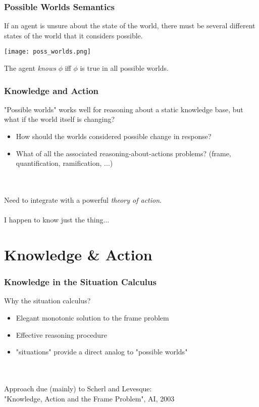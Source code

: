 \documentclass{beamer}
\begin{document}
\begin{frame}
\frametitle{Possible Worlds Semantics}

If an agent is unsure about the state of the world, there must be several
different states of the world that it considers possible.

\begin{center}
  \texttt{[image: poss\_worlds.png]}
\end{center}

The agent \emph{knows} $\phi$ iff $\phi$ is true in all possible worlds.

\end{frame}

\begin{frame}
\frametitle{Knowledge and Action}
"Possible worlds" works well for reasoning about a static knowledge base,
but what if the world itself is changing?
\begin{itemize}
\item  How should the worlds considered possible change in response?
\item  What of all the associated reasoning-about-actions problems? (frame, quantification, ramification, ...)
\end{itemize}
\ \\
\ \\
Need to integrate with a powerful \emph{theory of action}.
\pause
\ \\
\ \\
I happen to know just the thing...
\end{frame}

\section{Knowledge \& Action}

\begin{frame}
\frametitle{Knowledge in the Situation Calculus}

Why the situation calculus?
\begin{itemize}
\item Elegant monotonic solution to the frame problem
\item Effective reasoning procedure
\item "situations" provide a direct analog to "possible worlds"
\end{itemize}
\ \\
\ \\
Approach due (mainly) to Scherl and Levesque:\\
"Knowledge, Action and the Frame Problem", AI, 2003

\end{frame}
\end{document}

